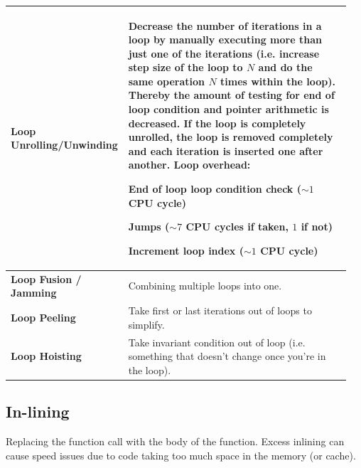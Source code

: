 			\begin{longtable}{|>{\bfseries}p{0.3\linewidth}|p{0.65\linewidth}|}
					\hline	
						Loop Unrolling/Unwinding
					& Decrease the number of iterations in a loop by manually executing more than just one of the iterations (i.e. increase step size of the loop to $N$ and do the same operation $N$ times within the loop). Thereby the amount of testing for end of loop condition and pointer arithmetic is decreased. If the loop is completely unrolled, the loop is removed completely and each iteration is inserted one after another.\newline
					\textbf{Loop overhead:}
					\begin{compactitem}
						\item End of loop loop condition check ($\sim 1$ CPU cycle)
						\item Jumps ($\sim 7$ CPU cycles if taken, $1$ if not)
						\item Increment loop index ($\sim 1$ CPU cycle)
					\end{compactitem} \\[-\normalbaselineskip]
					\hline				
					Loop Fusion / Jamming
						& Combining multiple loops into one.\\
					\hline
					Loop Peeling
						& Take first or last iterations out of loops to simplify.\\
					\hline		
					Loop Hoisting
					& Take invariant condition out of loop (i.e. something that doesn't change once you're in the loop).\\
					\hline
			\end{longtable}		
		
	\subsection{In-lining}
		Replacing the function call with the body of the function. Excess inlining can cause speed issues due to code taking too much space in the memory (or cache).